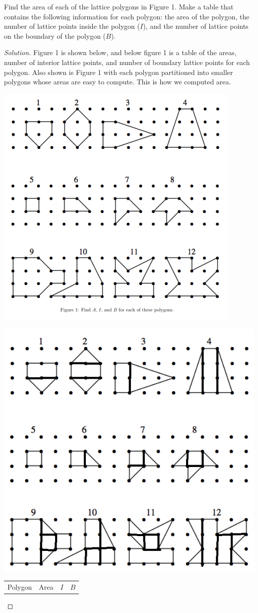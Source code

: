 \documentclass[12pt]{article}
\newenvironment{exercise}[2][Exercise]{\begin{trivlist}
        \item[\hskip \labelsep {\bfseries #1}\hskip \labelsep {\bfseries #2.}]}{\end{trivlist}}
\newenvironment{solution}
        {\begin{proof}[Solution]}
                    {\end{proof}}
\begin{document}
\begin{exercise}{15}
    Find the area of each of the lattice polygons in Figure 1. Make a table that contains the following information for each polygon: the area of the polygon, the number of lattice points inside the polygon (\( I \)), and the number of lattice points on the boundary of the polygon (\( B \)).
    \begin{solution}
        Figure 1 is shown below, and below figure 1 is a table of the areas, number of interior lattice points, and number of boundary lattice points for each polygon. Also shown is Figure 1 with each polygon partitioned into smaller polygons whose areas are easy to compute. This is how we computed area.
        \begin{center}
            \includegraphics[width=.5\linewidth]{15}
        \end{center}
        \begin{center}
            \includegraphics[width=.5\linewidth]{15-1}
        \end{center}
        \begin{center}
            \begin{tabular}{| r | l | l | l |}
                \hline
                Polygon \hspace{.75cm} & Area\hspace{1.25cm} & \( I \) \hspace{1.75cm} & \( B \) \hspace{1.75cm} \\ [.5ex]

\end{tabular}
\end{center}
\end{solution}
\end{exercise}
\end{document}
